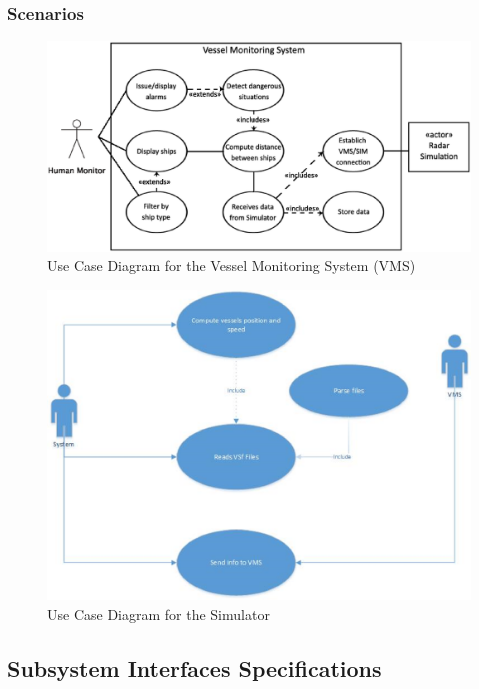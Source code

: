 \documentclass{article}
\begin{document}
\subsubsection{Scenarios} %
\begin{figure}[!htb]
\caption{Use Case Diagram for the Vessel Monitoring System (VMS)}
\centering
\includegraphics[scale=0.4]{diagrams/vmsdiagram.eps}
\end{figure}

\begin{figure}[!htb]
\caption{Use Case Diagram for the Simulator}
\centering
\includegraphics[scale=0.4]{diagrams/usecasediagram.eps}
\end{figure}

\subsection{Subsystem Interfaces Specifications} %
\end{document}
